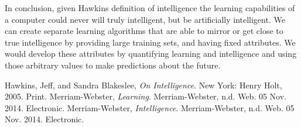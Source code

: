 \documentclass[11pt, oneside]{article}
\begin{document}
\par In conclusion, given Hawkins definition of intelligence the learning capabilities of a computer could never will truly intelligent, but be artificially intelligent. We can create separate learning algorithms that are able to mirror or get close to true intelligence by providing large training sets, and having fixed attributes. We would develop these attributes by quantifying learning and intelligence and using those arbitrary values to make predictions about the future. 

\begin{thebibliography}{9}
  Hawkins, Jeff, and Sandra Blakeslee,
  \emph{On Intelligence}.
  New York: Henry Holt, 2005.
  Print.
  Merriam-Webster,
  \emph{Learning}.
  Merriam-Webster, n.d. Web. 05 Nov. 2014.
  Electronic.
  Merriam-Webster,
  \emph{Intelligence}.
  Merriam-Webster, n.d. Web. 05 Nov. 2014.
  Electronic.
\end{thebibliography}
\end{document}
